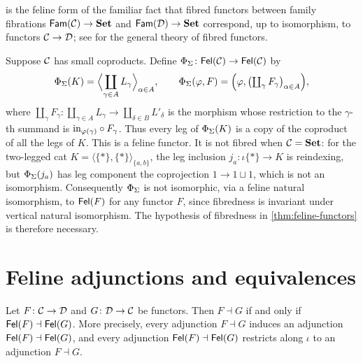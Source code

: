 \begin{remark}\label{rem:feline-functors-honest}
 is the feline form of the familiar fact that
fibred functors between family fibrations $\mathsf{Fam}(\mathcal{C})\to\mathbf{Set}$ and
$\mathsf{Fam}(\mathcal{D})\to\mathbf{Set}$ correspond, up to isomorphism, to functors $\mathcal{C}\to\mathcal{D}$; see
\cite{Jacobs1999} for the general theory of fibred functors.
\end{remark}

\begin{counterexample}\label{cex:body-sharing}
Suppose $\mathcal{C}$ has small coproducts. Define $\Phi_\Sigma\colon\mathsf{Fel}(\mathcal{C})\to\mathsf{Fel}(\mathcal{C})$
by
\[
\Phi_\Sigma(K)=\Bigl\langle\coprod_{\gamma\in A}L_\gamma\Bigr\rangle_{\alpha\in A},
\qquad
\Phi_\Sigma(\varphi,F)=\Bigl(\varphi,\bigl(\textstyle\coprod_\gamma F_\gamma\bigr)_{\alpha\in A}\Bigr),
\]
where $\coprod_\gamma F_\gamma\colon\coprod_{\gamma\in A}L_\gamma\to\coprod_{\delta\in B}L'_\delta$
is the morphism whose restriction to the $\gamma$-th summand is
$\mathrm{in}_{\varphi(\gamma)}\circ F_\gamma$. Thus every leg of $\Phi_\Sigma(K)$ is a copy
of the coproduct of all the legs of $K$. This is a feline functor. It is not
fibred when $\mathcal{C}=\mathbf{Set}$: for the two-legged cat $K=\langle\{*\},\{*\}\rangle_{\{a,b\}}$,
the leg inclusion $j_a\colon\iota\{*\}\to K$ is reindexing, but $\Phi_\Sigma(j_a)$
has leg component the coprojection
$1\to1\sqcup1$, which is not an isomorphism. Consequently $\Phi_\Sigma$ is not
isomorphic, via a feline natural isomorphism, to $\mathsf{Fel}(F)$ for any functor
$F$, since fibredness is invariant under vertical natural isomorphism. The
hypothesis of fibredness in \cref{thm:feline-functors} is therefore
necessary.
\end{counterexample}

\section{Feline adjunctions and equivalences}\label{sec:feline-adjunctions}

\begin{proposition}\label{prop:Fel-adjunction}
Let $F\colon\mathcal{C}\to\mathcal{D}$ and $G\colon\mathcal{D}\to\mathcal{C}$ be functors. Then $F\dashv G$ if
and only if $\mathsf{Fel}(F)\dashv\mathsf{Fel}(G)$. More precisely, every adjunction
$F\dashv G$ induces an adjunction $\mathsf{Fel}(F)\dashv\mathsf{Fel}(G)$, and every adjunction
$\mathsf{Fel}(F)\dashv\mathsf{Fel}(G)$ restricts along $\iota$ to an adjunction $F\dashv G$.
\end{proposition}

